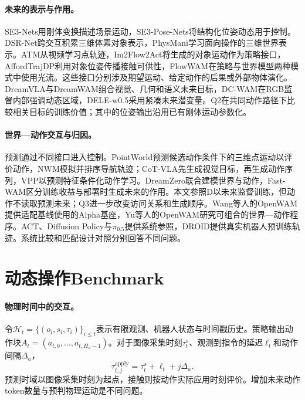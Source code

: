 \paragraph{未来的表示与作用。}
SE3-Nets用刚体变换描述场景运动\cite{se3nets}，SE3-Pose-Nets将结构化位姿动态用于控制\cite{se3posenets}。DSR-Net跨交互积累三维体素对象表示\cite{dsr}，PhysMani学习面向操作的三维世界表示\cite{physmani}。ATM从视频学习点轨迹\cite{atm}，Im2Flow2Act将生成的对象运动作为策略接口\cite{im2flow2act}，AffordTrajDP利用对象位姿传播接触可供性\cite{affordtraj}，FlowWAM在策略与世界模型两种模式中使用光流\cite{flowwam}。这些接口分别涉及期望运动、给定动作的后果或外部物体演化。DreamVLA与DreamWAM组合视觉、几何和语义未来目标\cite{dreamvla,dreamwam}，DC-WAM在RGB监督内部强调动态区域\cite{dcwam}，DELE-w0.5采用紧凑未来潜变量\cite{dele}。Q2在共同动作路径下比较相关目标的训练价值；其中的位姿输出沿用已有刚体运动参数化。

\paragraph{世界—动作交互与归因。}
预测通过不同接口进入控制。PointWorld预测候选动作条件下的三维点运动以评价动作\cite{pointworld}，NWM模拟并排序导航轨迹\cite{nwm}；CoT-VLA先生成视觉目标，再生成动作序列\cite{cotvla}，VPP以预测特征条件化动作学习\cite{vpp}。DreamZero联合建模世界与动作\cite{dreamzero}，Fast-WAM区分训练收益与部署时生成未来的作用\cite{fastwam}。本文参照D以未来监督训练，但动作不读取预测未来；Q3进一步改变访问关系和生成顺序。Wang等人的OpenWAM提供适配基线使用的Alpha基座\cite{openwam_alpha}，Yu等人的OpenWAM研究可组合的世界—动作程序\cite{openwam}。ACT、Diffusion Policy与$\pi_{0.5}$提供系统参照\cite{act,diffusionpolicy,pi05}，DROID提供真实机器人预训练轨迹\cite{droid}。系统比较和匹配设计对照分别回答不同问题。

\section{动态操作Benchmark}

\paragraph{物理时间中的交互。}
令$\mathcal H_t=\{(o_i,s_i,\tau_i)\}_{i\le t}$表示有限观测、机器人状态与时间戳历史。策略输出动作块$A_t=(a_{t,0},\ldots,a_{t,H_a-1})$。对于图像采集时刻$\tau_t^s$、观测到指令的延迟$\ell_t$和动作间隔$\Delta_a$，
\begin{equation}
\tau^{\mathrm{apply}}_{t,j}=\tau_t^s+\ell_t+j\Delta_a.
\end{equation}
预测时域以图像采集时刻为起点，接触则按动作实际应用时刻评价。增加未来动作token数量与预判物理运动是不同问题。

